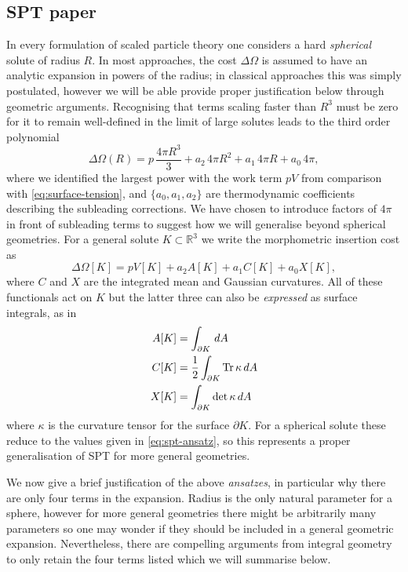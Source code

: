 \subsection{SPT paper}

In every formulation of scaled particle theory one considers a hard \emph{spherical} solute of radius $R$.
In most approaches, the cost $\Delta \Omega$ is assumed to have an analytic expansion in powers of the radius; in classical approaches this was simply postulated, however we will be able provide proper justification below through geometric arguments.
Recognising that terms scaling faster than $R^3$ must be zero for it to remain well-defined in the limit of large solutes leads to the third order polynomial \cite{ReissJCP1959}
\begin{equation}\label{eq:spt-ansatz}
  \Delta\Omega(R) =
  p \, \frac{4\pi R^3}{3} + a_2 \, 4 \pi R^2 + a_1 \, 4 \pi R + a_0 \, 4 \pi,
\end{equation}
where we identified the largest power with the work term $pV$ from comparison with \eqref{eq:surface-tension}, and $\{a_0, a_1, a_2\}$ are thermodynamic coefficients describing the subleading corrections.
We have chosen to introduce factors of $4\pi$ in front of subleading terms to suggest how we will generalise beyond spherical geometries.
For a general solute $K \subset \mathbb{R}^3$ we write the morphometric insertion cost as
\begin{equation}\label{eq:morph-ansatz}
  \Delta\Omega[K] =
  p V[K]
  + a_2 A[K]
  + a_1 C[K]
  + a_0 X[K],
\end{equation}
where $C$ and $X$ are the integrated mean and Gaussian curvatures.
All of these functionals act on $K$ but the latter three can also be \emph{expressed} as surface integrals, as in
\begin{subequations}
  \begin{align}
    A[K]
    &=
    \int_{\partial K} \, dA
    \\
    C[K]
    &=
    \frac{1}{2} \int_{\partial K} \operatorname*{Tr}{\kappa} \, dA
    \\
    X[K]
    &=
    \int_{\partial K} \det{\kappa} \, dA
  \end{align}
\end{subequations}
where $\kappa$ is the curvature tensor for the surface $\partial K$.
For a spherical solute these reduce to the values given in \eqref{eq:spt-ansatz}, so this represents a proper generalisation of SPT for more general geometries.

We now give a brief justification of the above \emph{ansatzes}, in particular why there are only four terms in the expansion.
Radius is the only natural parameter for a sphere, however for more general geometries there might be arbitrarily many parameters so one may wonder if they should be included in a general geometric expansion.
Nevertheless, there are compelling arguments from integral geometry \cite{KonigPRL2004} to only retain the four terms listed which we will summarise below.

